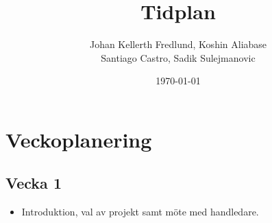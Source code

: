 \documentclass[a4paper]{article}
\title{Tidplan}
\author{Johan Kellerth Fredlund, Koshin Aliabase\\ Santiago Castro, Sadik Sulejmanovic}
\date{\today}
\begin{document}
\maketitle



\section{Veckoplanering}

	\subsection*{Vecka 1}
    
    \begin{itemize}
    \item Introduktion, val av projekt samt möte med handledare.
	\end{itemize}
\end{document}
